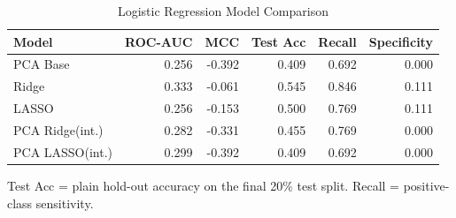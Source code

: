 \begin{table}[htbp]
\centering
\caption{Logistic Regression Model Comparison}
\label{tab:logistic\_regression\_comparison}
\begin{tabular}{lrrrrr}
\toprule
Model & ROC-AUC & MCC & Test Acc & Recall & Specificity \\
\midrule
PCA Base & 0.256 & -0.392 & 0.409 & 0.692 & 0.000 \\
Ridge & 0.333 & -0.061 & 0.545 & 0.846 & 0.111 \\
LASSO & 0.256 & -0.153 & 0.500 & 0.769 & 0.111 \\
PCA Ridge(int.) & 0.282 & -0.331 & 0.455 & 0.769 & 0.000 \\
PCA LASSO(int.) & 0.299 & -0.392 & 0.409 & 0.692 & 0.000 \\
\bottomrule
\end{tabular}
\par\smallskip
\footnotesize Test Acc = plain hold-out accuracy on the final 20\% test split. Recall = positive-class sensitivity.
\end{table}
